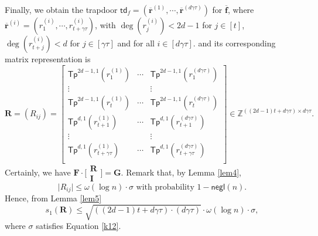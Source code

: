 \documentclass[runningheads]{llncs}
\begin{document}
 Finally, we obtain  the trapdoor $\textsf{td}_f=(\overline{\mathbf{r}}^{(1)}, \cdots, \overline{\mathbf{r}}^{(d \gamma \tau)})$ for $\overline{\textbf{f}}$, where $\overline{\mathbf{r}}^{(i)}=(r^{(i)}_{1}, \cdots, r^{(i)}_{t+\gamma \tau}) $,
     with $\deg(r^{(i)}_j)<2d-1$ for $j\in[t]$, $\deg(r^{(i)}_{t+j})<d$ for $j \in [\gamma \tau]$ and for all $i \in [d \gamma \tau]$. and its corresponding matrix representation is
 \begin{equation}\label{k13}
 \textbf{R}=(R_{ij})=\begin{bmatrix}
 \mathsf{Tp}^{2d-1,1}(r^{(1)}_{1})& \cdots& \mathsf{Tp}^{2d-1,1}(r^{(d\gamma \tau)}_{1})\\
 \vdots&&\vdots\\
 \mathsf{Tp}^{2d-1,1}(r^{(1)}_{t}) & \cdots& \mathsf{Tp}^{2d-1,1}(r^{(d\gamma \tau)}_{t})\\
 \mathsf{Tp}^{d,1}(r^{(1)}_{t+1})& \cdots& \mathsf{Tp}^{d,1}(r^{(d\gamma \tau)}_{t+1})\\
 \vdots&&\vdots\\
 \mathsf{Tp}^{d,1}(r^{(1)}_{t+\gamma \tau})& \cdots& \mathsf{Tp}^{d,1}(r^{(d\gamma \tau)}_{t+\gamma \tau})\\ 
 \end{bmatrix} \in \mathbb{Z}^{((2d-1)t+d\gamma \tau) \times d\gamma \tau}.
 \end{equation}
 Certainly, we have $\mathbf{F}\cdot \bigl[ \begin{smallmatrix}
         \mathbf{R}\\ \mathbf{I}
       \end{smallmatrix} \bigr]=\mathbf{G}$.  Remark that, by Lemma \ref{lem4},
  \begin{equation}\label{k17}
  \vert R_{ij} \vert \leq \omega(\log n)\cdot  \sigma \mbox { with probability } 1-\mathsf{negl}(n).  
  \end{equation} 
  Hence, from Lemma \ref{lem5}
   \begin{equation}\label{k18}
 s_1(\mathbf{R}) \leq \sqrt{((2d-1)t+d\gamma \tau)\cdot (d\gamma \tau)}\cdot \omega(\log n) \cdot \sigma,  
  \end{equation}
   where $\sigma$ satisfies Equation \eqref{k12}.
   
  
    
\end{document}
